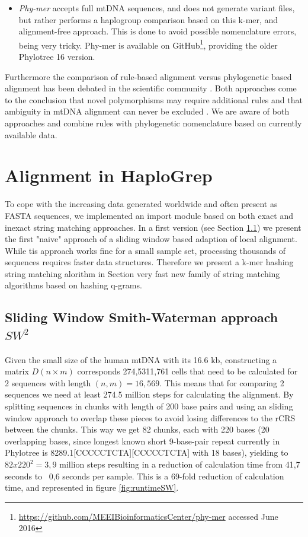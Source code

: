 \begin{itemize}
\item \textit{Phy-mer} \cite{Navarro-gomez2014} accepts full mtDNA sequences, and does not generate variant files, but rather performs a haplogroup comparison based on this k-mer, and alignment-free approach. This is done to avoid possible nomenclature errors, being very tricky. Phy-mer is available on GitHub\footnote{\url{https://github.com/MEEIBioinformaticsCenter/phy-mer} accessed June 2016 }, providing  the older Phylotree 16 version.
\end{itemize}
Furthermore the comparison of rule-based alignment versus phylogenetic based alignment has been debated in the scientific community \cite{Bandelt2008, Polanskey2010}. Both approaches come to the conclusion that novel polymorphisms may require additional rules and that ambiguity in mtDNA alignment can never be excluded \cite{Bandelt2008}. We are aware of both approaches and combine rules with phylogenetic nomenclature based on currently available data.
\section{Alignment in HaploGrep}
To cope with the increasing data generated worldwide and often present as FASTA sequences, we implemented an import module based on both exact and inexact string matching approaches. In a first version (see Section \ref{swsw}) we present the first "naive" approach of a sliding window based adaption of local alignment. While tis approach works fine for a small sample set, processing thousands of sequences requires faster data structures. Therefore we present a k-mer hashing string matching alorithm in Section very fast new family of string matching algorithms based on hashing q-grams. 
\subsection{Sliding Window Smith-Waterman approach $SW^{2}$}
\label{swsw}
Given the small size of the human mtDNA with its 16.6 kb, constructing a matrix $D(n \times m)$ corresponds 274,5311,761 cells that need to be calculated for 2 sequences with length $(n,m) = 16,569$. This means that for comparing 2 sequences we need at least 274.5 million steps for calculating the alignment. By splitting sequences in chunks with length of 200 base pairs and using an sliding window approach to overlap these pieces to avoid losing differences to the rCRS between the chunks. This way we get 82 chunks, each with 220 bases (20 overlapping bases, since longest known short 9-base-pair repeat currently in Phylotree is 8289.1[CCCCCTCTA][CCCCCTCTA] with 18 bases), yielding to $82 x 220^2 = 3,9$ million steps resulting in a reduction of calculation time from 41,7 seconds to ~0,6 seconds per sample. This is a 69-fold reduction of calculation time, and represented in figure \ref{fig:runtimeSW}. 

